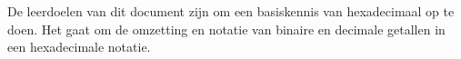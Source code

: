 De leerdoelen van dit document zijn om een basiskennis van hexadecimaal op te doen. Het gaat om de omzetting en notatie van binaire en decimale getallen in een hexadecimale notatie.
